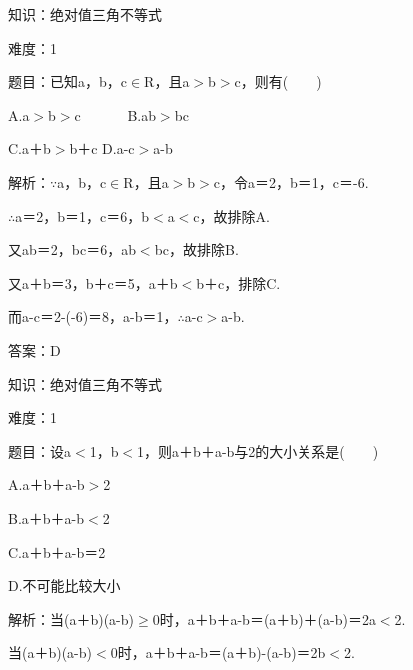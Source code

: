 \documentclass{article} %
\begin{document}
知识：绝对值三角不等式

难度：1

题目：已知a，b，c$\mathrm{\in}$R，且a$\mathrm{>}$b$\mathrm{>}$c，则有(　　)

A.{\textbar}a{\textbar}$\mathrm{>}${\textbar}b{\textbar}$\mathrm{>}${\textbar}c{\textbar}　　　  B.{\textbar}ab{\textbar}$\mathrm{>}${\textbar}bc{\textbar}

C.{\textbar}a＋b{\textbar}$\mathrm{>}${\textbar}b＋c{\textbar}  D.{\textbar}a-c{\textbar}$\mathrm{>}${\textbar}a-b{\textbar}

解析：$\mathrm{\because}$a，b，c$\mathrm{\in}$R，且a$\mathrm{>}$b$\mathrm{>}$c，令a＝2，b＝1，c＝-6.

$\mathrm{\therefore}${\textbar}a{\textbar}＝2，{\textbar}b{\textbar}＝1，{\textbar}c{\textbar}＝6，{\textbar}b{\textbar}$\mathrm{<}${\textbar}a{\textbar}$\mathrm{<}${\textbar}c{\textbar}，故排除A.

又{\textbar}ab{\textbar}＝2，{\textbar}bc{\textbar}＝6，{\textbar}ab{\textbar}$\mathrm{<}${\textbar}bc{\textbar}，故排除B.

又{\textbar}a＋b{\textbar}＝3，{\textbar}b＋c{\textbar}＝5，{\textbar}a＋b{\textbar}$\mathrm{<}${\textbar}b＋c{\textbar}，排除C.

而{\textbar}a-c{\textbar}＝{\textbar}2-(-6){\textbar}＝8，{\textbar}a-b{\textbar}＝1，$\mathrm{\therefore}${\textbar}a-c{\textbar}$\mathrm{>}${\textbar}a-b{\textbar}.

答案：D



知识：绝对值三角不等式

难度：1

题目：设{\textbar}a{\textbar}$\mathrm{<}$1，{\textbar}b{\textbar}$\mathrm{<}$1，则{\textbar}a＋b{\textbar}＋{\textbar}a-b{\textbar}与2的大小关系是(　　)

A.{\textbar}a＋b{\textbar}＋{\textbar}a-b{\textbar}$\mathrm{>}$2

B.{\textbar}a＋b{\textbar}＋{\textbar}a-b{\textbar}$\mathrm{<}$2

C.{\textbar}a＋b{\textbar}＋{\textbar}a-b{\textbar}＝2

D.不可能比较大小

解析：当(a＋b)(a-b)$\mathrm{\ge}$0时，{\textbar}a＋b{\textbar}＋{\textbar}a-b{\textbar}＝{\textbar}(a＋b)＋(a-b){\textbar}＝2{\textbar}a{\textbar}$\mathrm{<}$2.

当(a＋b)(a-b)$\mathrm{<}$0时，{\textbar}a＋b{\textbar}＋{\textbar}a-b{\textbar}＝{\textbar}(a＋b)-(a-b){\textbar}＝2{\textbar}b{\textbar}$\mathrm{<}$2.
\end{document}
